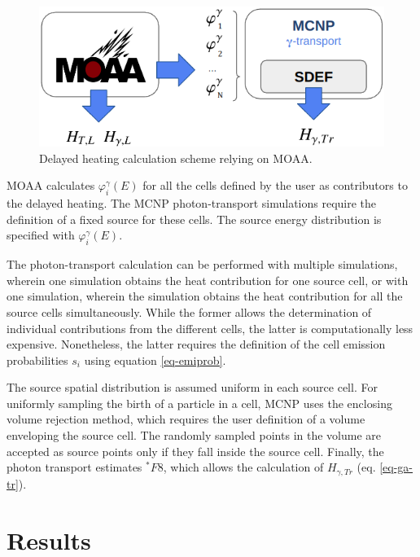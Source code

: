 \documentclass{style/nseJournal}
\begin{document}
\begin{figure}[htbp!]
  \begin{center}
    \includegraphics[width=0.90\linewidth]{figures/heat_flow}
  \end{center}
  \caption{Delayed heating calculation scheme relying on MOAA.}
  \label{fig:workflow_2}
\end{figure}

MOAA calculates $\varphi^\gamma_i(E)$ for all the cells defined by the user as contributors to the delayed heating.
The MCNP photon-transport simulations require the definition of a fixed source for these cells.
The source energy distribution is specified with $\varphi^\gamma_i(E)$.

The photon-transport calculation can be performed with multiple simulations, wherein one simulation obtains the heat contribution for one source cell, or with one simulation, wherein the simulation obtains the heat contribution for all the source cells simultaneously.
While the former allows the determination of individual contributions from the different cells, the latter is computationally less expensive.
Nonetheless, the latter requires the definition of the cell emission probabilities $s_i$ using equation \ref{eq-emiprob}.

The source spatial distribution is assumed uniform in each source cell.
For uniformly sampling the birth of a particle in a cell, MCNP uses the enclosing volume rejection method, which requires the user definition of a volume enveloping the source cell.
The randomly sampled points in the volume are accepted as source points only if they fall inside the source cell.
Finally, the photon transport estimates $^\ast F8$, which allows the calculation of $H_{\gamma, Tr}$ (eq. \ref{eq-ga-tr}).


\section{Results}
\label{sec:results}
\end{document}

